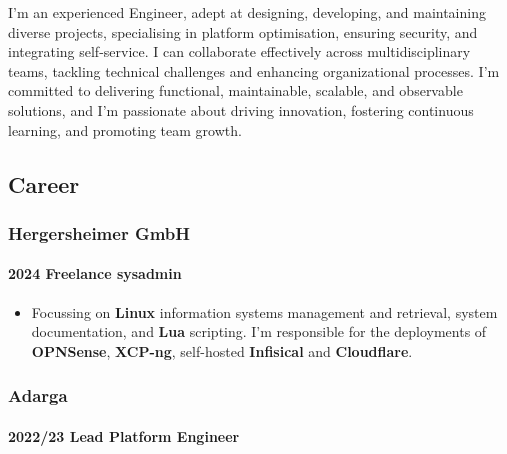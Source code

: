 \documentclass[
]{article}
\providecommand{\tightlist}{%
  \setlength{\itemsep}{0pt}\setlength{\parskip}{0pt}}
\begin{document}
I'm an experienced Engineer, adept at designing, developing, and
maintaining diverse projects, specialising in platform optimisation,
ensuring security, and integrating self-service. I can collaborate
effectively across multidisciplinary teams, tackling technical
challenges and enhancing organizational processes. I'm committed to
delivering functional, maintainable, scalable, and observable solutions,
and I'm passionate about driving innovation, fostering continuous
learning, and promoting team growth.

\hypertarget{material-briefcase-career}{%
\subsection{\texorpdfstring{\faBriefcase
Career}{ Career}}\label{material-briefcase-career}}

\hypertarget{material-office-building-hergersheimer-gmbh}{%
\subsubsection{\texorpdfstring{\faBuilding Hergersheimer
GmbH}{ Hergersheimer GmbH}}\label{material-office-building-hergersheimer-gmbh}}

\hypertarget{freelance-sysadmin}{%
\paragraph{2024 Freelance sysadmin}\label{freelance-sysadmin}}

\begin{itemize}
\tightlist
\item
  Focussing on \textbf{Linux} information systems management and
  retrieval, system documentation, and \textbf{Lua} scripting. I'm
  responsible for the deployments of \textbf{OPNSense}, \textbf{XCP-ng},
  self-hosted \textbf{Infisical} and \textbf{Cloudflare}.
\end{itemize}

\hypertarget{material-office-building-adarga}{%
\subsubsection{\texorpdfstring{\faBuilding
Adarga}{ Adarga}}\label{material-office-building-adarga}}

\hypertarget{lead-platform-engineer}{%
\paragraph{2022/23 Lead Platform
Engineer}\label{lead-platform-engineer}}
\end{document}
